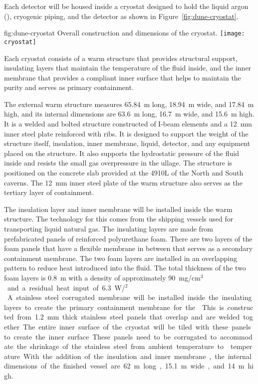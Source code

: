 Each detector will be housed inside a cryostat designed to hold the
liquid argon (), cryogenic piping, and the detector as shown in
Figure~\ref{fig:dune-cryostat}.
\begin{dunefigure}{fig:dune-cryostat}
  {Overall construction and dimensions of the  cryostat.}
  \texttt{[image: cryostat]}
\end{dunefigure}
Each cryostat consists of a warm structure that provides structural
support, insulating layers that maintain the temperature of the fluid
inside, and the inner membrane that provides a compliant inner surface
that helps to maintain the  purity and serves as primary
containment.

The external warm structure measures \SI{65.84}{\meter} long,
\SI{18.94}{\meter} wide, and \SI{17.84}{\meter} high, and its internal dimensions are 
\SI{63.6}{\meter} long, \SI{16.7}{\meter} wide, and \SI{15.6}{\meter}
high.  It is a welded and bolted structure constructed of
I-beam elements and a \SI{12}{\mm} inner steel plate reinforced with
ribs.  It is designed to support the
weight of the structure itself, 
insulation, inner membrane, liquid, detector, and any equipment placed
on the structure.  It also supports the hydrostatic pressure of the
fluid inside and resists the small gas overpressure in the ullage.
The structure is positioned on the concrete slab provided at the 4910L
of the North and South caverns.  The \SI{12}{\mm} inner steel plate of the
warm structure also serves as the tertiary layer of containment.

The insulation layer and inner membrane will be installed inside the
warm structure.  The technology for this comes from the shipping
vessels used for transporting liquid natural gas. The insulating
layers are made from prefabricated panels of reinforced polyurethane
foam.  There are two layers of the foam panels that have a flexible
membrane in between that serves as a secondary containment membrane.
The two foam layers are installed in an overlapping pattern to reduce
heat introduced into the fluid.  The total thickness of the two foam
layers is \SI{0.8}{\meter} with a density of approximately
\SI{90}{mg/cm$^3$} and a residual heat input of
\SI{6.3}{W/\meter$^2$}.  A stainless steel corrugated membrane will be
installed inside the insulating layers to create the primary
containment membrane for the .  This is constructed from \SI{1.2}{\mm}
thick stainless steel panels that overlap and are welded together.
The entire inner surface of the cryostat will be tiled with these
panels to create the inner surface.  These panels need to be
corrugated to accommodate the shrinkage of the stainless steel from
ambient temperature to  temperature.  With the addition of the
insulation and inner membrane, the internal dimensions of the finished
vessel are \SI{62}{\meter} long, \SI{15.1}{\meter} wide, and
\SI{14}{\meter} high.

